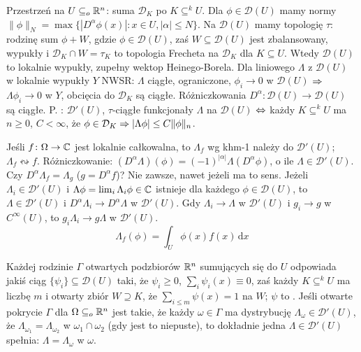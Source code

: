
Przestrzeń   na $U \subseteq_o \mathbb{R}^n$: suma $\mathcal D_K$ po $K \subseteq^k U$.
Dla $\phi \in \mathcal D(U)$ mamy normy $\|\phi\|_N = \max \{|D^\alpha \phi(x)| : x \in U, |\alpha| \le N\}$.
Na $\mathcal D(U)$ mamy topologię $\tau$: rodzinę sum $\phi + W$, gdzie $\phi \in \mathcal D(U)$, zaś $W \subseteq \mathcal D(U)$ jest zbalansowany, wypukły i $\mathcal D_K \cap W = \tau_K$ to topologia Frecheta na $\mathcal D_K$ dla $K \subseteq U$.
Wtedy $\mathcal D(U)$ to lokalnie wypukły, zupełny wektop Heinego-Borela.
Dla liniowego $\Lambda$ z $\mathcal D(U)$ w lokalnie wypukły $Y$ NWSR: $\Lambda$ ciągłe, ograniczone, $\phi_i \to 0$ w $\mathcal D(U)$ $\Rightarrow$ $\Lambda \phi_i \to 0$ w $Y$, obcięcia do $\mathcal D_K$ są ciągłe.
Różniczkowania $D^\alpha \colon \mathcal D(U) \to \mathcal D(U)$ są ciągłe.
P. : $\mathcal D'(U)$, $\tau$-ciągłe funkcjonały $\Lambda$ na $\mathcal D(U)$ $\Leftrightarrow$ każdy $K \subseteq^k U$ ma $n \ge 0$, $C < \infty$, że $\phi \in \mathcal D_K \Rightarrow |\Lambda \phi| \le C \|\phi\|_n$.

Jeśli  $f \colon \Omega \to \mathbb{C}$ jest lokalnie całkowalna, to $\Lambda_f$ wg khm-1 należy do $\mathcal D'(U)$; $\Lambda_f \leftrightsquigarrow f$.
Różniczkowanie: $(D^\alpha \Lambda)(\phi) = (-1)^{|\alpha|} \Lambda (D^\alpha \phi)$, o ile $\Lambda \in \mathcal D'(U)$.
Czy $D^\alpha \Lambda_f = \Lambda_g$ ($g = D^\alpha f$)?
Nie zawsze, nawet jeżeli ma to sens.
Jeżeli $\Lambda_i \in \mathcal D'(U)$ i $\Lambda \phi = \lim_i \Lambda_i \phi \in \mathbb{C}$ istnieje dla każdego $\phi \in \mathcal D(U)$, to $\Lambda \in \mathcal D'(U)$ i $D^\alpha \Lambda_i \to D^\alpha \Lambda$ w $\mathcal D'(U)$.
Gdy $\Lambda_i \to \Lambda$ w $\mathcal D'(U)$ i $g_i \to g$ w $C^\infty(U)$, to $g_i\Lambda_i \to g\Lambda$ w $\mathcal D'(U)$.
\[
	\Lambda_f (\phi) = \int_U \phi(x) f(x) \,\textrm{d}x
\]

Każdej  rodzinie $\Gamma$ otwartych podzbiorów $\mathbb{R}^n$ sumujących się do $U$ odpowiada jakiś ciąg $\{\psi_i\} \subseteq \mathcal D(U)$ taki, że $\psi_i \ge 0$, $\sum_i \psi_i(x) \equiv 0$, zaś każdy $K \subseteq^k U$ ma liczbę $m$ i otwarty zbiór $W \supseteq K$, że $\sum_{i \le m} \psi(x) = 1$ na $W$; $\psi$ to .
Jeśli otwarte pokrycie $\Gamma$ dla $\Omega \subseteq_o \mathbb{R}^n$ jest takie, że każdy $\omega \in \Gamma$ ma dystrybucję $\Lambda_\omega \in \mathcal D'(U)$, że $\Lambda_{\omega_1} = \Lambda_{\omega_2}$ w $\omega_1 \cap \omega_2$ (gdy jest to niepuste), to dokładnie jedna $\Lambda \in \mathcal D'(U)$ spełnia: $\Lambda = \Lambda_\omega$ w $\omega$.

